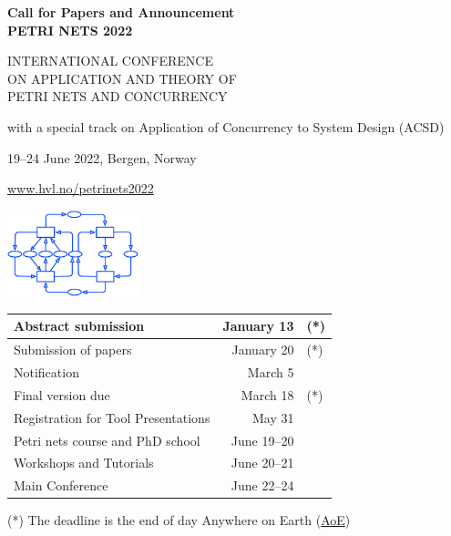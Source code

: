 \documentclass[10pt]{article}
\begin{document}
\begin{multicols}{2}
\begin{center}
{\large\bf
Call for Papers and Announcement \\
\smallskip PETRI NETS 2022

\bigskip

 INTERNATIONAL CONFERENCE\\
ON APPLICATION AND THEORY OF \\
PETRI NETS AND CONCURRENCY

\smallskip

with a special track on Application of Concurrency to System Design (ACSD)
\bigskip

19--24 June 2022, Bergen, Norway}

\smallskip

\href{https://www.hvl.no/petrinets2022}{www.hvl.no/petrinets2022} 

\smallskip

\end{center}

\columnbreak

\begin{center}
\includegraphics[height=2.5cm]{logos/LogoPN.pdf}


\begin{tabular}{|l|r@{, 2022 }l|}
\hline
Abstract submission & January 13 & (*) \\
\hline
Submission of papers & January 20 & (*) \\
\hline
Notification & March 5 & \\
\hline
Final version due & March 18 & (*) \\
\hline
Registration for Tool Presentations & May 31 & \\
\hline
Petri nets course and PhD school & June 19--20 & \\
\hline
Workshops and Tutorials & June 20--21 & \\
\hline
Main Conference & June 22--24 & \\
\hline
\end{tabular}

{\small (*) The deadline is the end of day Anywhere on Earth (\href{https://en.wikipedia.org/wiki/Anywhere_on_Earth}{AoE})}
\end{center}
\end{multicols}
\end{document}
